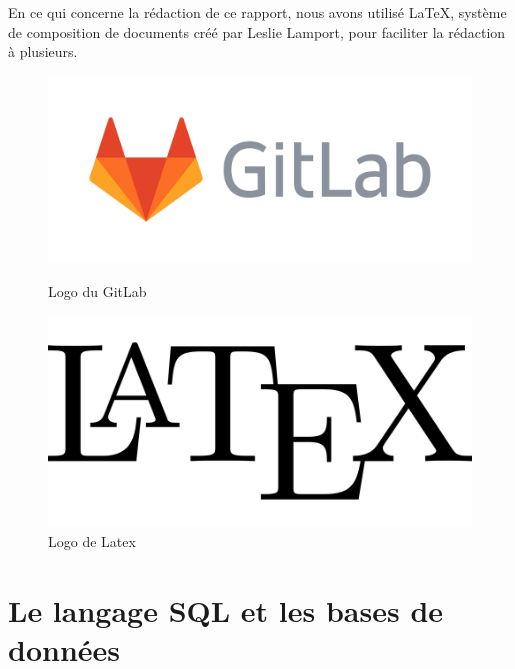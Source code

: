 \documentclass[oneside,13pt,a4paper]{report}
\begin{document}
En ce qui concerne la rédaction de ce rapport, nous avons utilisé \LaTeX, système de composition de documents créé par Leslie Lamport, pour faciliter la rédaction à plusieurs.

\begin{figure}[h]
	\begin{minipage}[c]{.46\linewidth}
		\centering
		\includegraphics[width=1\textwidth]{img/gitlab.png}
		\caption{Logo du GitLab}
	\end{minipage}
	\hfill%
	\begin{minipage}[c]{.46\linewidth}
		\centering
		\includegraphics[width=1\textwidth]{img/latex.png}
		\caption{Logo de Latex}
	\end{minipage}
\end{figure}



\chapter{Le langage SQL et les bases de données}

\end{document}
